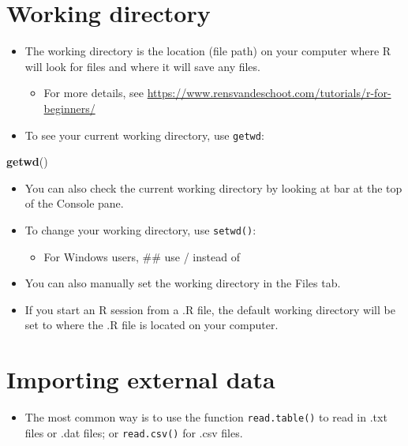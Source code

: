 \documentclass[
]{book}
\newenvironment{Shaded}{\begin{snugshade}}{\end{snugshade}}
\newcommand{\FunctionTok}[1]{\textcolor[rgb]{0.13,0.29,0.53}{\textbf{#1}}}
\newcommand{\NormalTok}[1]{#1}
\providecommand{\tightlist}{%
  \setlength{\itemsep}{0pt}\setlength{\parskip}{0pt}}
\begin{document}
\section{Working directory}\label{working-directory}

\begin{itemize}
\tightlist
\item
  The working directory is the location (file path) on your computer where R will look for files and where it will save any files.

  \begin{itemize}
  \tightlist
  \item
    For more details, see \url{https://www.rensvandeschoot.com/tutorials/r-for-beginners/}
  \end{itemize}
\item
  To see your current working directory, use \texttt{getwd}:
\end{itemize}

\begin{Shaded}
\begin{Highlighting}[]
\FunctionTok{getwd}\NormalTok{()}
\end{Highlighting}
\end{Shaded}

\begin{itemize}
\item
  You can also check the current working directory by looking at bar at the top of the Console pane.
\item
  To change your working directory, use \texttt{setwd()}:

  \begin{itemize}
  \tightlist
  \item
    For Windows users, \#\# use / instead of\\
  \end{itemize}
\item
  You can also manually set the working directory in the Files tab.
\item
  If you start an R session from a .R file, the default working directory will be set to where the .R file is located on your computer.
\end{itemize}

\section{Importing external data}\label{importing-external-data}

\begin{itemize}
\tightlist
\item
  The most common way is to use the function \texttt{read.table()} to read in .txt files or .dat files; or \texttt{read.csv()} for .csv files.
\end{itemize}
\end{document}
